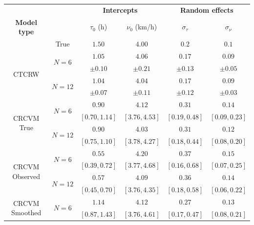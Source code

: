 \documentclass[aoas]{imsart}
\theoremstyle{definition}
\theoremstyle{remark}
\theoremstyle{remark}
\newcommand {\1}{\mathbb{1}}
\begin{document}
\begin{table}[ht!]
		\centering
		\begin{tabular}{|c|c|cccc|}
			\hline
			     & &\multicolumn{2}{|c}{\textbf{Intercepts}}  & \multicolumn{2}{c|}{\textbf{Random effects}} \\
			\cline{3-6}
			     \textbf{Model type} & &$ \tau_0 $ (h) & $\nu_0 $ (km/h)& $\sigma_{\tau}$ & $\sigma_{\nu}$  \\
			\cline{2-6} 
			& True & $1.50$ & $4.00$ & $0.2$ & $0.1$ \\
            \hline
            \multirow{4}{6em}{CTCRW} & \multirow{2}{4em}{$N=6$}  & $1.05$ &
			$4.06$ &
			$0.17$ & $0.09$ 
			\\
			& & $\pm 0.10$ &
			$\pm 0.21$ &
			$\pm 0.13$ & 
			$\pm 0.05$ 
			\\
			& \multirow{2}{4em}{$N=12$} & $1.04$ &
			$4.04$ &
			$0.17$ & $0.09$ 
			\\
			& & $\pm 0.07$  &
			$ \pm 0.11$ &
			$ \pm 0.12 $ & $ \pm 0.03$ 
            \\
            \hline
            \multirow{4}{6em}{CRCVM \hspace{0.1cm} True} & \multirow{2}{4em}{$N=6$} & $0.90$ &
			$4.12$ &
			$0.31$ &
			$0.14$
			\\
			& &	$[0.70,1.14]$ &
			$ [3.76,4.53] $&
			$[0.19,0.48]$ & $ [0.09,0.23]$ 
			\\
			& \multirow{2}{4em}{$N=12$} & $0.90$ &
			$4.03$ & $0.31$ & $0.12$
			
			\\
			& & $[0.75,1.10]$ &
			$  [3.78,4.27]$ &
			$ [0.18,0.44]$ &
			$ [0.08,0.20]$ 
			\\
            \hline
            \multirow{4}{6em}{CRCVM Observed} & \multirow{2}{4em}{$N=6$} & $0.55$ &
			$4.20$ &
			$0.37$ &
			$0.15$
			
			\\
			& &	$[0.39,0.72]$ &
			$[3.77,4.68]$&
			$[0.16,0.68]$ & $[0.07,0.25]$ 
			\\
			& \multirow{2}{4em}{$N=12$} & $0.57$ &
			$4.09$ & $0.36$ & $0.14$
			
			\\
			& & $ [0.45,0.70]$ &
			$ [3.76,4.35]$ &
			$[0.18,0.58]$ &
			$[0.06,0.22]$ 
			\\
			\hline	
			\multirow{4}{6em}{CRCVM Smoothed} & \multirow{2}{4em}{$N=6$}  & $1.14$ &
			$4.12 $ &
			$0.27$ & $0.13$ 
			\\
			& & $[0.87,1.43]$ &
			$[3.76,4.61]$ &
			$[0.17,0.47]$ & 
			$[0.08,0.21]$ 
			

\end{tabular}
\end{table}
\end{document}
